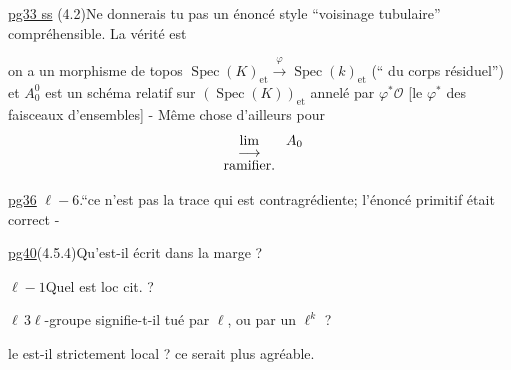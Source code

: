 \noindent{}
\uline{pg33 ss}\quad
(4.2)\quad Ne donnerais tu pas un énoncé style ``voisinage tubulaire'' compréhensible. La vérité est

 on a un morphisme de topos $\operatorname{Spec}(K)_{\mathrm{et}}\xrightarrow{\varphi}\operatorname{Spec}(k)_{\mathrm{et}}$ (`` du corps résiduel'') et $A_0^0$ est un schéma relatif sur $(\operatorname{Spec}(K))_{\mathrm{et}}$ annelé par $\varphi^*\mathcal O$ [le $\varphi^*$ des faisceaux d'ensembles] - Même chose d'ailleurs pour
\[
\begin{array}[t]{c}\text{lim}\\[-.8ex]\longrightarrow\\[-.6ex]\text{ramifier.}\end{array}\;A_0
\]

\noindent{}
\uline{pg36}\quad
$\ell-6$.\quad ``ce n'est pas la trace qui est contragrédiente; l'énoncé primitif était correct -

\noindent\uline{pg40}\quad (4.5.4)\quad Qu'est-il écrit dans la marge ?

$\ell-1$\quad Quel est loc cit. ?

$\ell\,3$\quad $\ell$-groupe signifie-t-il tué par $\ell$, ou par un $\ell^k$ ?

le  est-il strictement local ? ce serait plus agréable.

